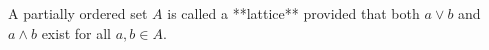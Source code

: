 A partially ordered set $A$ is called a **lattice** provided that both $a \vee b$ and $a \wedge b$ exist for all $a, b \in A$.
